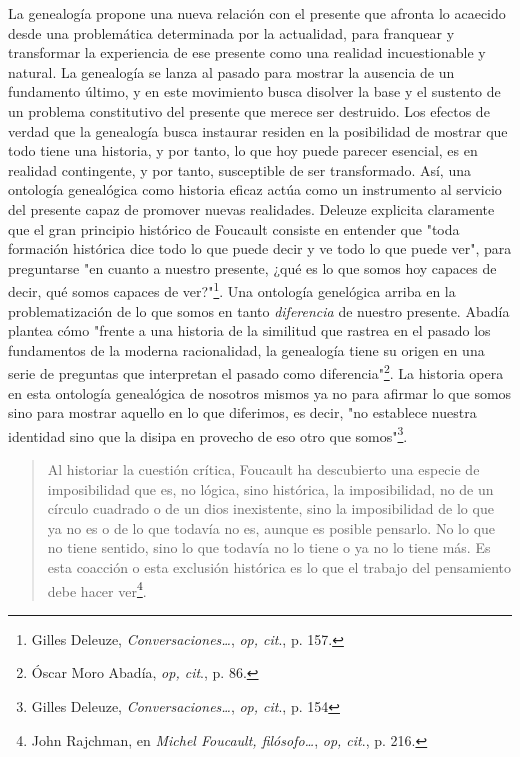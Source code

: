 La genealogía propone una nueva relación con el presente que afronta lo
acaecido desde una problemática determinada por la actualidad, para
franquear y transformar la experiencia de ese presente como una realidad
incuestionable y natural. La genealogía se lanza al pasado para mostrar
la ausencia de un fundamento último, y en este movimiento busca disolver
la base y el sustento de un problema constitutivo del presente que
merece ser destruido. Los efectos de verdad que la genealogía busca
instaurar residen en la posibilidad de mostrar que todo tiene una
historia, y por tanto, lo que hoy puede parecer esencial, es en realidad
contingente, y por tanto, susceptible de ser transformado. Así, una
ontología genealógica como historia eficaz actúa como un instrumento al
servicio del presente capaz de promover nuevas realidades. Deleuze
explicita claramente que el gran principio histórico de Foucault
consiste en entender que "toda formación histórica dice todo lo que
puede decir y ve todo lo que puede ver", para preguntarse "en cuanto a
nuestro presente, ¿qué es lo que somos hoy capaces de decir, qué somos
capaces de ver?"\footnote{Gilles Deleuze, \emph{Conversaciones\ldots{}},
  \emph{op, cit}., p. 157.}. Una ontología genelógica arriba en la
problematización de lo que somos en tanto \emph{diferencia} de nuestro
presente. Abadía plantea cómo "frente a una historia de la similitud que
rastrea en el pasado los fundamentos de la moderna racionalidad, la
genealogía tiene su origen en una serie de preguntas que interpretan el
pasado como diferencia"\footnote{Óscar Moro Abadía, \emph{op, cit}., p.
  86.}. La historia opera en esta ontología genealógica de nosotros
mismos ya no para afirmar lo que somos sino para mostrar aquello en lo
que diferimos, es decir, "no establece nuestra identidad sino que la
disipa en provecho de eso otro que somos"\footnote{Gilles Deleuze,
  \emph{Conversaciones\ldots{}}, \emph{op, cit}., p. 154}.

\begin{quote}
Al historiar la cuestión crítica, Foucault ha descubierto una especie de
imposibilidad que es, no lógica, sino histórica, la imposibilidad, no de
un círculo cuadrado o de un dios inexistente, sino la imposibilidad de
lo que ya no es o de lo que todavía no es, aunque es posible pensarlo.
No lo que no tiene sentido, sino lo que todavía no lo tiene o ya no lo
tiene más. Es esta coacción o esta exclusión histórica es lo que el
trabajo del pensamiento debe hacer ver\footnote{John Rajchman, en
  \emph{Michel Foucault, filósofo\ldots{}}, \emph{op, cit}., p. 216.}.
\end{quote}

